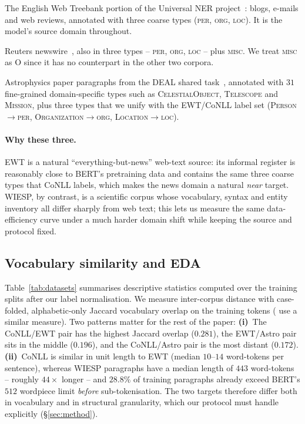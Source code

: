 \documentclass[11pt]{article}
\begin{document}
\begin{description}[leftmargin=0.7em,labelindent=0pt]
  \item[EWT (source).] The English Web Treebank portion of the Universal NER
    project~\citep{mayhew-etal-2024-universal}: blogs, e-mails and web reviews,
    annotated with three coarse types (\textsc{per}, \textsc{org},
    \textsc{loc}). It is the model's source domain throughout.
  \item[CoNLL-2003 (similar target).]
    Reuters newswire~\citep{tjong-kim-sang-de-meulder-2003-introduction}, also
    in three types -- \textsc{per}, \textsc{org}, \textsc{loc} -- plus
    \textsc{misc}. We treat \textsc{misc} as \textsf{O} since it has no
    counterpart in the other two corpora.
  \item[WIESP-2022 (distant target).]
    Astrophysics paper paragraphs from the DEAL shared
    task~\citep{grezes-etal-2022-overview}, annotated with $31$ fine-grained
    domain-specific types such as \textsc{CelestialObject}, \textsc{Telescope}
    and \textsc{Mission}, plus three types that we unify with the EWT/CoNLL
    label set (\textsc{Person}$\to$\textsc{per},
    \textsc{Organization}$\to$\textsc{org},
    \textsc{Location}$\to$\textsc{loc}).
\end{description}

\paragraph{Why these three.}
EWT is a natural ``everything-but-news'' web-text source: its informal
register is reasonably close to BERT's pretraining data and contains the same
three coarse types that CoNLL labels, which makes the news domain a natural
\emph{near} target. WIESP, by contrast, is a scientific corpus whose
vocabulary, syntax and entity inventory all differ sharply from web text;
this lets us measure the same data-efficiency curve under a much harder
domain shift while keeping the source and protocol fixed.

\subsection{Vocabulary similarity and EDA}
\label{sec:eda}

Table~\ref{tab:datasets} summarises descriptive statistics computed over the
training splits after our label normalisation. We measure inter-corpus
distance with case-folded, alphabetic-only Jaccard vocabulary overlap on the
training tokens (\citealp{liu-etal-2021-crossner} use a similar measure).
Two patterns matter for the rest of the paper:
\textbf{(i)}~The CoNLL/EWT pair has the highest Jaccard overlap ($0.281$),
the EWT/Astro pair sits in the middle ($0.196$), and the CoNLL/Astro pair is
the most distant ($0.172$).
\textbf{(ii)}~CoNLL is similar in unit length to EWT (median $10$--$14$
word-tokens per sentence), whereas WIESP paragraphs have a median length of
$443$ word-tokens -- roughly $44\times$ longer -- and $28.8\%$ of training
paragraphs already exceed BERT's $512$ wordpiece limit \emph{before}
sub-tokenisation. The two targets therefore differ both in vocabulary and in
structural granularity, which our protocol must handle explicitly
(\S\ref{sec:method}).
\end{document}
